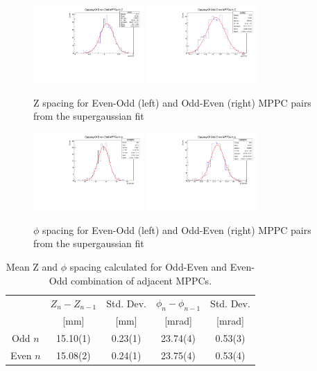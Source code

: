 \begin{figure}
\centering
\includegraphics[width=4.2cm]{graphics/eotdzfit.pdf}
\includegraphics[width=4.2cm]{graphics/oetdzfit.pdf}
\caption{Z spacing for Even-Odd (left) and Odd-Even (right) MPPC pairs from the supergaussian fit}
\label{fig:zeovsoespacing} 
\end{figure}
\begin{figure}
\centering
\includegraphics[width=4.2cm]{graphics/eotdphifit.pdf}
\includegraphics[width=4.2cm]{graphics/oetdphifit.pdf}
\caption{$\phi$ spacing for Even-Odd (left) and Odd-Even (right) MPPC pairs from the supergaussian fit}
\label{fig:phieovsoespacing} 
\end{figure}

\begin{table}
\begin{tabular}{ccccc}
 & $Z_{n} - Z_{n-1}$ &Std. Dev.& $\phi_{n} - \phi_{n-1}$ & Std. Dev. \\
 & [mm] &[mm]& [mrad]& [mrad]\\
\hline
Odd  $n$ & 15.10(1) & 0.23(1) & 23.74(4) & 0.53(3) \\ 
Even $n$ & 15.08(2) & 0.24(1) & 23.75(4) & 0.53(4) \\ 
\end{tabular}
\caption{Mean Z and $\phi$ spacing calculated for Odd-Even and Even-Odd
combination  of adjacent MPPCs.}
\label{tab:oddeven}
\end{table}
